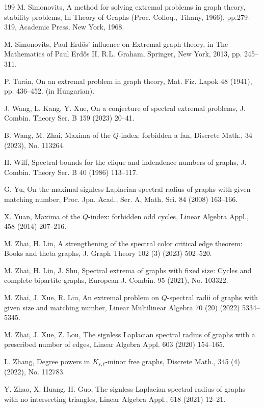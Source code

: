 \documentclass[11pt,a4paper]{article}
\theoremstyle{plain}
\theoremstyle{definition}
\begin{document}
\begin{thebibliography}{199}
 M. Simonovits, A method for solving extremal problems in graph theory, stability problems,  {In Theory of Graphs (Proc. Colloq., Tihany, 1966)}, pp.279-319, Academic Press, New York, 1968. 

M. Simonovits,  
Paul Erd\H{o}s' influence on Extremal graph theory, 
in The Mathematics of Paul Erd\H{o}s II, 
R.L. Graham, Springer, New York, 2013, pp. 245--311. 

P. Tur\'{a}n, 
On an extremal problem in graph theory, 
Mat. Fiz. Lapok 48 (1941), pp. 436--452. 
(in Hungarian).

J. Wang, L. Kang, Y. Xue, 
On a conjecture of spectral extremal problems, 
J. Combin. Theory Ser. B 159 (2023) 20--41.  

B. Wang, M. Zhai, 
Maxima of the $Q$-index: forbidden a fan,  
{Discrete Math.}, 34 (2023), No. 113264.

H. Wilf, 
Spectral bounds for the clique and indendence numbers of graphs, 
J. Combin. Theory Ser. B 40 (1986) 113--117.  


G. Yu, On the maximal signless Laplacian spectral radius of graphs with given matching number, Proc. Jpn. Acad., Ser. A, Math. Sci. 84 (2008) 163--166.

 X. Yuan, Maxima of the $Q$-index: forbidden odd cycles,  {Linear Algebra Appl.}, 458 (2014) 207--216.

M. Zhai, H. Lin,
A strengthening of the spectral color critical edge theorem: Books and theta graphs,
J. Graph Theory 102 (3) (2023) 502--520. 


 M. Zhai,  H. Lin,  J. Shu, 
Spectral extrema of graphs with fixed size: Cycles and complete bipartite graphs, 
European J. Combin. 95 (2021), No. 103322. 

M. Zhai, J. Xue, R. Liu, 
An extremal problem on $Q$-spectral radii of graphs with given size and matching number, 
Linear Multilinear Algebra 70 (20) (2022) 
5334--5345.  

M. Zhai, J. Xue, Z. Lou,  
The signless Laplacian spectral radius of graphs with a prescribed number of edges, 
Linear Algebra Appl. 603 (2020) 154--165.


L. Zhang, Degree powers in $K_{s,t}$-minor free graphs, Discrete Math., 345 (4) (2022), No. 112783. 


Y. Zhao, X. Huang, H. Guo, The signless Laplacian spectral radius of graphs with no intersecting triangles,  
{Linear Algebra Appl.}, 618 (2021) 12--21.


\end{thebibliography}
\end{document}
